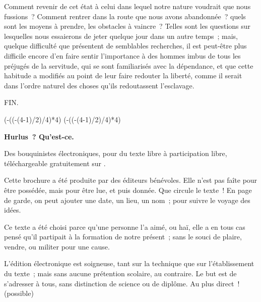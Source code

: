 \documentclass[french,twoside]{book} %
\newcommand\chapterclose{} %
\def\truncdiv#1#2{((#1-(#2-1)/2)/#2)}
\def\moduloop#1#2{(#1-\truncdiv{#1}{#2}*#2)}
\def\modulo#1#2{\number\numexpr\moduloop{#1}{#2}\relax}
\begin{document}
Comment revenir de cet état à celui dans lequel notre nature voudrait que nous fussions ? Comment rentrer dans la route que nous avons abandonnée ? quels sont les moyens à prendre, les obstacles à vaincre ? Telles sont les questions sur lesquelles nous essaierons de jeter quelque jour dans un autre temps ; mais, quelque difficulté que présentent de semblables recherches, il est peut-être plus difficile encore d’en faire sentir l’importance à des hommes imbus de tous les préjugés de la servitude, qui se sont familiarisés avec la dépendance, et que cette habitude a modifiés au point de leur faire redouter la liberté, comme il serait dans l’ordre naturel des choses qu’ils redoutassent l’esclavage.\par

\begin{center}
\noindent \centerline{FIN.}
\end{center}

\chapterclose

 


\ifbooklet
  \pagestyle{empty}
  \clearpage
  \ifnum\modulo{\value{page}}{4}=0 \hbox{}\newpage\hbox{}\newpage\fi
  \ifnum\modulo{\value{page}}{4}=1 \hbox{}\newpage\hbox{}\newpage\fi


  \hbox{}\newpage
  \ifodd\value{page}\hbox{}\newpage\fi
  {\centering\color{rubric}\bfseries\noindent\large
    Hurlus ? Qu’est-ce.\par
    \bigskip
  }
  \noindent Des bouquinistes électroniques, pour du texte libre à participation libre,
  téléchargeable gratuitement sur \href{https://hurlus.fr}{}.\par
  \bigskip
  \noindent Cette brochure a été produite par des éditeurs bénévoles.
  Elle n’est pas faîte pour être possédée, mais pour être lue, et puis donnée.
  Que circule le texte !
  En page de garde, on peut ajouter une date, un lieu, un nom ; pour suivre le voyage des idées.
  \par

  Ce texte a été choisi parce qu’une personne l’a aimé,
  ou haï, elle a en tous cas pensé qu’il partipait à la formation de notre présent ;
  sans le souci de plaire, vendre, ou militer pour une cause.
  \par

  L’édition électronique est soigneuse, tant sur la technique
  que sur l’établissement du texte ; mais sans aucune prétention scolaire, au contraire.
  Le but est de s’adresser à tous, sans distinction de science ou de diplôme.
  Au plus direct ! (possible)
  \par
\end{document}
